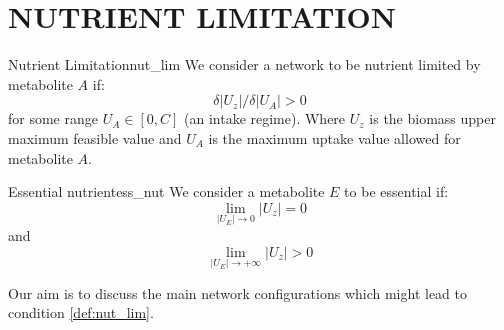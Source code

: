 \documentclass[
10pt, %
a4paper, %
oneside, %
headinclude,footinclude, %
BCOR5mm, %
]{scrartcl}
\title{\normalfont\spacedallcaps{NUTRIENT-LIMITATION IN COMPLEX MEDIUM}} %
\subtitle{(not a paper draft)} %
\date{} %
\begin{document}

\renewcommand{\sectionmark}[1]{\markright{\spacedlowsmallcaps{#1}}} %
\lehead{\mbox{\llap{\small\thepage\kern1em\color{halfgray} \vline}\color{halfgray}\hspace{0.5em}\rightmark\hfil}} %

\pagestyle{scrheadings} %

\maketitle %

\setcounter{tocdepth}{2} %


\section{NUTRIENT LIMITATION}
\label{sec:cell_lep}

\begin{mydef}{Nutrient Limitation}{nut_lim}
We consider a network to be nutrient limited by metabolite $A$ if:
$$\delta |U_z| / \delta |U_A| > 0$$
for some range $U_A \in [0, C]$ (an intake regime).
Where $U_z$ is the biomass upper maximum feasible value and
$U_A$ is the maximum uptake value allowed for metabolite $A$.
\end{mydef}

\begin{mydef}{Essential nutrient}{ess_nut}
We consider a metabolite $E$ to be essential if:
$$\lim_{|U_E| \to 0} |U_z| = 0$$
and
$$\lim_{|U_E| \to +\infty} |U_z| > 0$$
\end{mydef}

Our aim is to discuss the main network configurations which might lead to condition \ref{def:nut_lim}.
\end{document}
